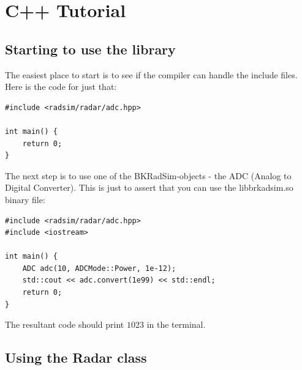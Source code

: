 \documentclass[letterpaper]{book}
\begin{document}
\chapter{C++ Tutorial}
\section{Starting to use the library}
The easiest place to start is to see if the compiler can handle the include files. Here is the code for just that:
\begin{lstlisting}
#include <radsim/radar/adc.hpp>

int main() {
    return 0;
}
\end{lstlisting}
The next step is to use one of the BKRadSim-objects - the ADC (Analog to Digital Converter). This is just to assert that you can use the libbrkadsim.so binary file:
\begin{lstlisting}
#include <radsim/radar/adc.hpp>
#include <iostream>

int main() {
    ADC adc(10, ADCMode::Power, 1e-12);
    std::cout << adc.convert(1e99) << std::endl;
    return 0;
}
\end{lstlisting}
The resultant code should print \(1023\) in the terminal. 
\section{Using the Radar class}
\end{document}
